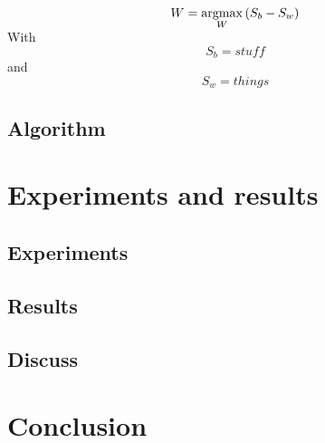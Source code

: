 \documentclass{techrep} %
\begin{document}
$$W = \smash{\mathop{{\rm argmax}}\limits_{W}}\, (S_b - S_w)$$
With
$$S_b = stuff$$
and
$$S_w = things$$
\section{Algorithm}

\chapter{Experiments and results}
\section{Experiments}
\section{Results}
\section{Discuss}
\chapter*{Conclusion}

 \nocite{*}
\end{document}
